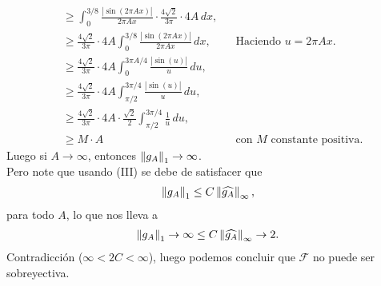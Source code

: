 \begin{homeworkProblem}
\begin{solution}
\begin{enumerate}[(i)]
\begin{align*}
          &\geq \int_{0}^{3/8}\frac{|\sin(2\pi Ax)|}{2\pi Ax}\cdot \frac{4\sqrt{2}}{3\pi}\cdot 4A\, dx,\\
          &\geq \frac{4\sqrt{2}}{3\pi}\cdot 4A\int_{0}^{3/8}\frac{|\sin(2\pi Ax)|}{2\pi Ax}\, dx, &&\text{Haciendo $u=2\pi Ax$.}\\
          &\geq \frac{4\sqrt{2}}{3\pi}\cdot 4A \int_{0}^{3\pi A/4}\frac{|\sin(u)|}{u}\, du,\\
          &\geq \frac{4\sqrt{2}}{3\pi}\cdot 4A \int_{\pi/2}^{3\pi/4}\frac{|\sin(u)|}{u}\, du,\\
          &\geq \frac{4\sqrt{2}}{3\pi}\cdot 4A\cdot \frac{\sqrt{2}}{2} \int_{\pi/2}^{3\pi/4}\frac{1}{u}\, du,\\
          &\geq M\cdot A &&\text{con $M$ constante positiva}.
        \end{align*}
        Luego si $A\to \infty$, entonces $\left\|g_A\right\|_{1}\to\infty$.\\
        Pero note que usando (III) se debe de satisfacer que
        \begin{align*}
          \left\|g_A\right\|_{1}\leq C\left\|\widehat{g_A}\right\|_{\infty},
        \end{align*}
        para todo $A$, lo que nos lleva a
        \begin{align*}
          \left\|g_A\right\|_{1}\to \infty \leq C\left\|\widehat{g_A}\right\|_{\infty}\to 2.
        \end{align*}
        Contradicción ($\infty < 2C < \infty $), luego podemos concluir que $\mathcal{F}$ no puede ser sobreyectiva. 
    \end{enumerate}
  \end{solution}
\end{homeworkProblem}
